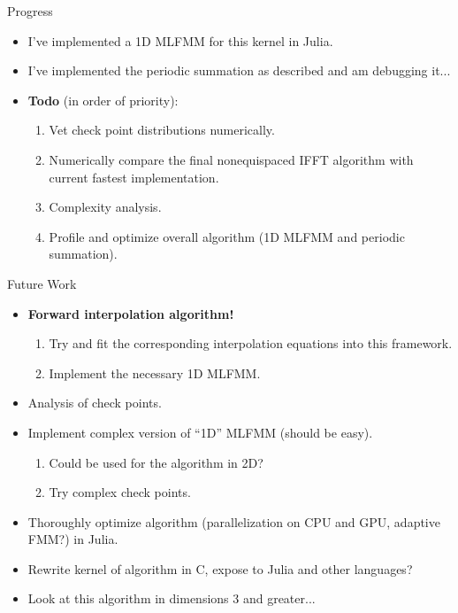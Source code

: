 \documentclass{beamer}
\begin{document}
\begin{frame}{Progress}
  \begin{itemize}
  \item I've implemented a 1D MLFMM for this kernel in Julia.
    \pause
  \item I've implemented the periodic summation as described and am debugging it...
    \pause
  \item \textbf{Todo} (in order of priority):
    \begin{enumerate}
    \item Vet check point distributions numerically.
      \pause
    \item Numerically compare the final nonequispaced IFFT algorithm with
      current fastest implementation.
      \pause
    \item Complexity analysis.
      \pause
    \item Profile and optimize overall algorithm (1D MLFMM and
      periodic summation).
    \end{enumerate}
  \end{itemize}
\end{frame}

\begin{frame}{Future Work}
  \begin{itemize}
  \item \textbf{Forward interpolation algorithm!}
    \pause
    \begin{enumerate}
    \item Try and fit the corresponding interpolation equations into this framework.
    \item Implement the necessary 1D MLFMM.
    \end{enumerate}
    \pause
  \item Analysis of check points.
    \pause
  \item Implement complex version of ``1D'' MLFMM (should be easy).
    \pause
    \begin{enumerate}
    \item Could be used for the algorithm in 2D?
    \item Try complex check points.
    \end{enumerate}
    \pause
  \item Thoroughly optimize algorithm (parallelization on CPU and GPU, adaptive FMM?) in Julia.
    \pause
  \item Rewrite kernel of algorithm in C, expose to Julia and other languages?
    \pause
  \item Look at this algorithm in dimensions 3 and greater...
  \end{itemize}
\end{frame}
\end{document}
